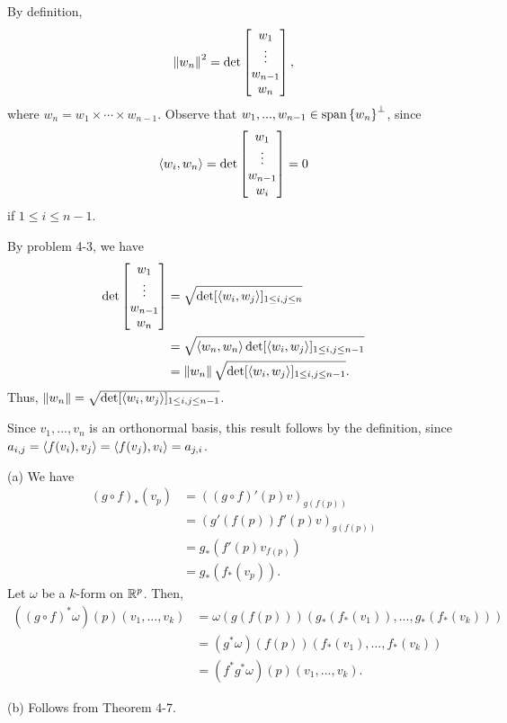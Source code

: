 \documentclass[11pt]{scrartcl}
\begin{document}
\begin{problem*}[4-10]
\end{problem*}
By definition, 
$$
    \left\lVert w_n \right\rVert^2 = \det\begin{bmatrix} w_1\\ \vdots \\ w_{n - 1}\\ w_n \end{bmatrix},
$$
where $w_n = w_1\times\cdots\times w_{n - 1}$.
Observe that $w_1, ..., w_{n - 1}\in \operatorname{span}\left\{ w_n \right\}^\perp$, since 
$$
    \langle w_i, w_n \rangle = \det\begin{bmatrix} w_1\\ \vdots\\ w_{n - 1}\\ w_i \end{bmatrix} = 0
$$ 
if $1\le i\le n - 1$.

By problem 4-3, we have 
\begin{align*}
    \det\begin{bmatrix} w_1\\ \vdots \\ w_{n - 1}\\ w_n \end{bmatrix} 
    &= 
    \sqrt{\det[\langle w_i, w_j \rangle]_{1\le i, j\le n}} \\
    &= 
    \sqrt{\langle w_n, w_n \rangle\det[\langle w_i, w_j \rangle]_{1\le i, j\le n - 1}} \\
    &=
    \left\lVert w_n \right\rVert\sqrt{\det[\langle w_i, w_j \rangle]_{1\le i, j\le n - 1}}.
\end{align*}
Thus, $\left\lVert w_n \right\rVert = \sqrt{\det[\langle w_i, w_j \rangle]_{1\le i, j\le n - 1}}$.

\begin{problem*}[4-11]
\end{problem*}
Since $v_1, ..., v_n$ is an orthonormal basis, this result follows by the definition, 
since $a_{i, j} = \langle f(v_i), v_j \rangle = \langle f(v_j), v_i \rangle = a_{j, i}$.

\begin{problem*}[4-13]
\end{problem*}
(a) We have 
\begin{align*}
    (g\circ f)_*(v_p) 
    &= 
    ((g\circ f)'(p)v)_{g(f(p))}\\
    &=
    (g'(f(p))f'(p)v)_{g(f(p))} \\
    &=
    g_*(f'(p)v_{f(p)}) \\
    &=
    g_*(f_*(v_p)).
\end{align*}
Let $\omega$ be a $k$-form on $\mathbb R^p$.
Then,
\begin{align*}
    ((g\circ f)^*\omega)(p)(v_1, ..., v_k) 
    &=
    \omega(g(f(p)))(g_*(f_*(v_1)), ..., g_*(f_*(v_k))) \\
    &=
    (g^*\omega)(f(p))(f_*(v_1), ..., f_*(v_k)) \\
    &=
    (f^*g^*\omega)(p)(v_1, ..., v_k).
\end{align*}

(b) Follows from Theorem 4-7.
\end{document}
